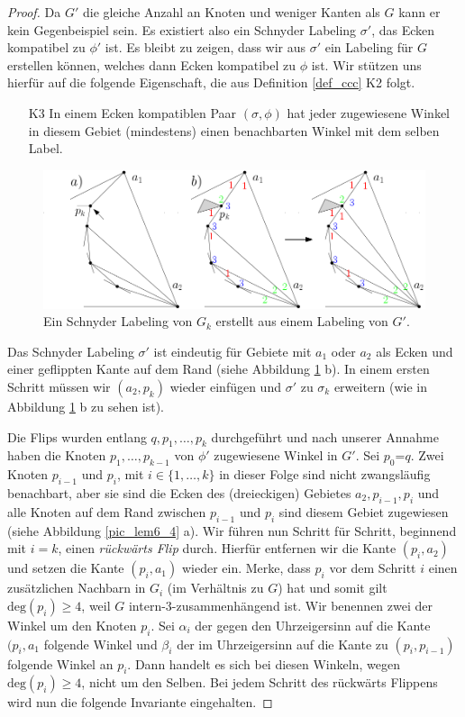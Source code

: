 \begin{proof}
Da $G'$ die gleiche Anzahl an Knoten und weniger Kanten als $G$ kann er kein Gegenbeispiel sein. Es existiert also ein Schnyder Labeling $\sigma'$, das Ecken kompatibel zu $\phi'$ ist. Es bleibt zu zeigen, dass wir aus $\sigma'$ ein Labeling für $G$ erstellen können, welches dann Ecken kompatibel zu $\phi$ ist. Wir stützen uns hierfür auf die folgende Eigenschaft, die aus Definition \ref{def_ccc} K2 folgt.

\begin{itemize} 
\item [K3] In einem Ecken kompatiblen Paar $(\sigma,\phi)$ hat jeder zugewiesene Winkel in diesem Gebiet (mindestens) einen benachbarten Winkel mit dem selben Label.
\end{itemize}

\begin{figure}
	\centering
	  \includegraphics[width=1\textwidth]{lem6_3.png}
    	\caption{Ein Schnyder Labeling von $G_k$ erstellt aus einem Labeling von $G'$. }
    	\label{pic_lem6_3}
\end{figure}

Das Schnyder Labeling $\sigma'$ ist eindeutig für Gebiete mit $a_1$ oder $a_2$ als Ecken und einer geflippten Kante auf dem Rand (siehe Abbildung \ref{pic_lem6_3} b). In einem ersten Schritt müssen wir $(a_2,p_k)$ wieder einfügen und $\sigma'$ zu $\sigma_k$ erweitern (wie in Abbildung \ref{pic_lem6_3} b zu sehen ist).

Die Flips wurden entlang $q,p_1,\ldots,p_k$ durchgeführt und nach unserer Annahme haben die Knoten $p_1,\ldots,p_{k-1}$ von $\phi'$ zugewiesene Winkel in $G'$. Sei $p_0$=$q$. Zwei Knoten $p_{i-1}$ und $p_i$, mit $i \in \{1,\ldots,k\}$ in dieser Folge sind nicht zwangsläufig benachbart, aber sie sind die Ecken des (dreieckigen) Gebietes $a_2,p_{i-1},p_{i}$ und alle Knoten auf dem Rand zwischen $p_{i-1}$ und $p_{i}$ sind diesem Gebiet zugewiesen (siehe Abbildung \ref{pic_lem6_4} a). Wir führen nun Schritt für Schritt, beginnend mit $i=k$, einen \textit{rückwärts Flip} durch. Hierfür entfernen wir die Kante $(p_{i},a_2)$ und setzen die Kante $(p_{i},a_1)$ wieder ein. Merke, dass $p_{i}$ vor dem Schritt $i$ einen zusätzlichen Nachbarn in $G_{i}$ (im Verhältnis zu $G$) hat und somit gilt $\text{deg}(p_{i}) \geq 4$, weil $G$ intern-3-zusammenhängend ist. Wir benennen zwei der Winkel um den Knoten $p_i$. Sei $\alpha_{i}$ der gegen den Uhrzeigersinn auf die Kante $(p_i,a_1$ folgende Winkel und $\beta_{i}$ der im Uhrzeigersinn auf die Kante zu $(p_i,p_{i-1})$ folgende Winkel an $p_{i}$. Dann handelt es sich bei diesen Winkeln, wegen $\text{deg}(p_i) \geq 4$, nicht um den Selben. Bei jedem Schritt des rückwärts Flippens wird nun die folgende Invariante eingehalten.


\end{proof}
